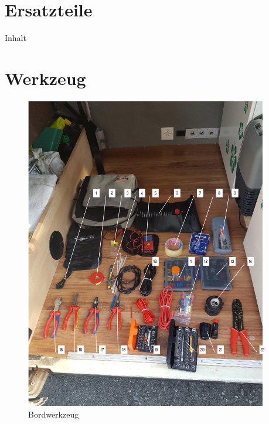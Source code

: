 \section{Ersatzteile}
Inhalt

\section{Werkzeug}

\begin{figure}[H]
	\centering
    \includegraphics[width=0.95\textwidth]{../Bilder/Anleitung/Equipment_Bordwerkzeug.png}
	\caption{Bordwerkzeug}
    \label{Werkzeug}
\end{figure}

